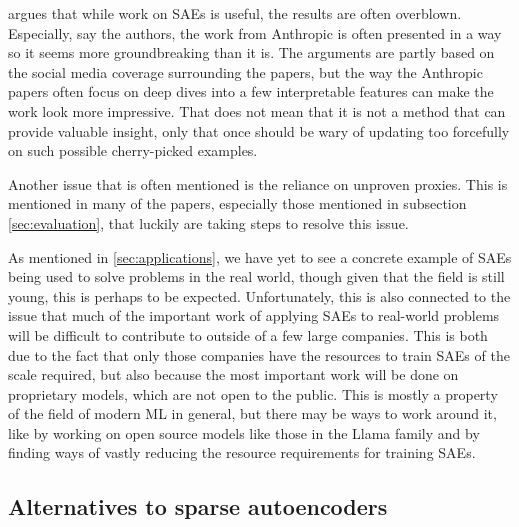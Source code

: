 \textcite{casper_eis_2024} argues that while work on SAEs is useful, the results are often overblown.
Especially, say the authors, the work from Anthropic \parencite{bricken_towards_2023}\parencite{templeton_scaling_2024} is often presented in a way so it seems more groundbreaking than it is.
The arguments are partly based on the social media coverage surrounding the papers, but the way the Anthropic papers often focus on deep dives into a few interpretable features can make the work look more impressive.
That does not mean that it is not a method that can provide valuable insight, only that once should be wary of updating too forcefully on such possible cherry-picked examples.

Another issue that is often mentioned is the reliance on unproven proxies.
This is mentioned in many of the papers, especially those mentioned in subsection \ref{sec:evaluation}, that luckily are taking steps to resolve this issue.

As mentioned in \ref{sec:applications}, we have yet to see a concrete example of SAEs being used to solve problems in the real world, though given that the field is still young, this is perhaps to be expected.
Unfortunately, this is also connected to the issue that much of the important work of applying SAEs to real-world problems will be difficult to contribute to outside of a few large companies.
This is both due to the fact that only those companies have the resources to train SAEs of the scale required, but also because the most important work will be done on proprietary models, which are not open to the public.
This is mostly a property of the field of modern ML in general, but there may be ways to work around it, like by working on open source models like those in the Llama family \parencite{touvron_llama_nodate} and by finding ways of vastly reducing the resource requirements for training SAEs.


\subsection{Alternatives to sparse autoencoders}\label{sec:alternatives_to_saes}

